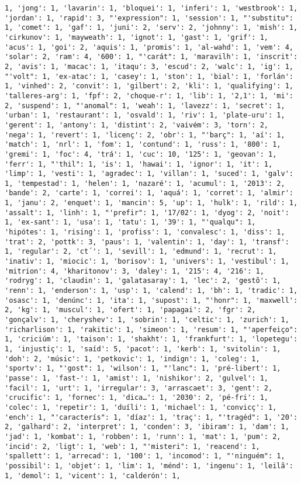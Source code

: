 \documentclass[11pt]{article}
\begin{document}
\begin{Verbatim}[commandchars=\\\{\}]
1, 'jong': 1, 'lavarin': 1, 'bloquei': 1, 'inferi': 1, 'westbrook': 1, 'jordan': 1, 'rapid': 3, "'expression": 1, 'session': 1, "'substitu": 1, 'comet': 1, 'gaf': 1, 'juni': 2, 'serv': 2, 'johnny': 1, 'mish': 1, 'cirkunov': 1, 'mayweath': 1, 'ignot': 1, 'gast': 1, 'grif': 1, 'acus': 1, 'goi': 2, 'aquis': 1, 'promis': 1, 'al-wahd': 1, 'vem': 4, 'solar': 2, 'ram': 4, '600': 1, "'carát": 1, 'maravilh': 1, 'inscrit': 2, 'avis': 1, 'macac': 1, 'itaqu': 3, 'escud': 2, 'walc': 1, 'ig': 1, "'volt": 1, 'ex-atac': 1, 'casey': 1, 'ston': 1, 'bial': 1, 'forlán': 1, 'vinhed': 2, 'convit': 1, 'gilbert': 2, 'kli': 1, 'qualifying': 1, 'talleres-arg': 1, 'fpf': 2, 'choque-r': 1, 'lib': 1, '2,1': 1, 'mi': 2, 'suspend': 1, "'anomal": 1, 'weah': 1, 'lavezz': 1, 'secret': 1, 'urban': 1, 'restaurant': 1, 'osvald': 1, 'riv': 1, 'plate-uru': 1, 'gerent': 1, 'antony': 1, 'distint': 2, 'vaivém': 3, 'torn': 2, 'nega': 1, 'revert': 1, 'licenç': 2, 'obr': 1, "'barç": 1, 'aí': 1, 'match': 1, 'nrl': 1, 'fom': 1, 'contund': 1, 'russ': 1, '800': 1, 'gremi': 1, 'foc': 4, 'trá': 1, 'cuc': 10, '125': 1, 'geovan': 1, 'ferr': 1, "'thil": 1, 'is': 1, 'hawai': 1, 'ignor': 1, 'it': 1, 'limp': 1, 'vesti': 1, 'agradec': 1, 'villan': 1, 'suced': 1, 'galv': 1, 'tempestad': 1, 'helen': 1, 'nazaré': 1, 'acumul': 1, '2013': 2, 'bande': 2, 'carte': 1, 'correi': 1, 'aquá': 1, 'corret': 1, 'almir': 1, 'janu': 2, 'enquet': 1, 'mancin': 5, 'up': 1, 'hulk': 1, 'rild': 1, 'assalt': 1, 'linh': 1, "'prefir": 1, '17/02': 1, 'dyog': 2, 'noit': 1, 'ex-sant': 1, 'usa': 1, 'tatu': 1, '39': 1, "'qualqu": 1, 'hipótes': 1, 'rising': 1, 'profiss': 1, 'convalesc': 1, 'diss': 1, 'trat': 2, 'pottk': 3, 'paus': 1, 'valentin': 1, 'day': 1, 'transf': 1, 'regular': 2, 'ct´': 1, 'sevill': 1, 'edmund': 1, 'recrut': 1, 'inativ': 1, 'miocic': 1, 'borisov': 1, 'univers': 1, 'vestibul': 1, 'mitrion': 4, 'kharitonov': 3, 'daley': 1, '215': 4, '216': 1, 'rodryg': 1, 'claudin': 1, 'galatasaray': 1, 'lec': 2, 'gestõ': 1, 'renn': 1, 'enderson': 1, 'usp': 1, 'calend': 1, 'bh': 1, 'tradic': 1, 'osasc': 1, 'denúnc': 1, 'ita': 1, 'supost': 1, "'honr": 1, 'maxwell': 2, 'kg': 1, 'muscul': 1, 'ofert': 1, 'papagai': 2, 'fgr': 2, 'gonçalv': 1, 'cheryshev': 1, 'sobrin': 1, 'celtic': 1, 'zurich': 1, 'richarlison': 1, 'rakitic': 1, 'simeon': 1, 'resum': 1, "'aperfeiço": 1, 'criciúm': 1, 'taison': 1, 'shakht': 1, 'frankfurt': 1, 'lopetegu': 1, 'injustiç': 1, 'saíd': 5, 'pacot': 1, 'kerb': 1, 'svitolin': 1, 'doh': 2, 'músic': 1, 'petkovic': 1, 'indign': 1, 'coleg': 1, 'sportv': 1, "'gost": 1, 'wilson': 1, "'lanc": 1, 'pré-libert': 1, 'passe': 1, 'fast-': 1, 'amist': 1, 'nishikor': 2, 'gulvel': 1, 'facil': 1, 'urt': 1, 'irregular': 3, 'arrascaet': 3, 'gent': 2, 'crucific': 1, 'fornec': 1, 'dica…': 1, '2030': 2, 'pé-fri': 1, 'colec': 1, 'repetir': 1, 'duíli': 1, 'michael': 1, 'convicç': 1, 'ench': 1, "'caracterís": 1, 'díaz': 1, 'traç': 1, "'tragéd": 1, '20': 2, 'galhard': 2, 'interpret': 1, 'conden': 3, 'ibiram': 1, 'dam': 1, 'jad': 1, 'kombat': 1, 'robben': 1, 'runn': 1, 'mat': 1, 'pum': 2, 'incid': 2, 'ligt': 1, 'web': 1, "'misteri": 1, 'reacend': 1, 'spallett': 1, 'arrecad': 1, '100': 1, 'incomod': 1, "'ninguém": 1, 'possibil': 1, 'objet': 1, 'lim': 1, 'ménd': 1, 'ingenu': 1, 'leilã': 1, 'demol': 1, 'vicent': 1, 'calderón': 1, 
\end{Verbatim}
\end{document}
